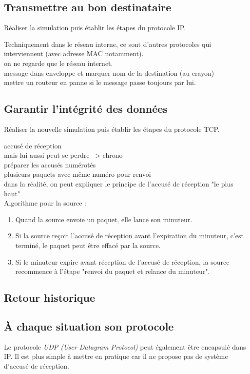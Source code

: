 \documentclass[a4paper,11pt]{article}
\begin{document}
\begin{Form}
\subsection{Transmettre au bon destinataire}
\begin{activite}
Réaliser la simulation puis établir les étapes du protocole IP. 
\end{activite}
\begin{commentprof}
Techniquement dans le réseau interne, ce sont d'autres protocoles qui interviennent (avec adresse MAC notamment).\\ on ne regarde que le réseau internet.\\message dans enveloppe et marquer nom de la destination (au crayon)\\mettre un routeur en panne si le message passe toujours par lui.
\end{commentprof}
\subsection{Garantir l'intégrité des données}
\begin{activite}
Réaliser la nouvelle simulation puis établir les étapes du protocole TCP. 
\end{activite}
\begin{commentprof}
accusé de réception\\mais lui aussi peut se perdre --> chrono\\préparer les accusés numérotés\\plusieurs paquets avec même numéro pour renvoi\\dans la réalité, on peut expliquer le principe de l'accusé de réception "le plus haut"\\
Algorithme pour la source :
\begin{enumerate}
\item Quand la source envoie un paquet, elle lance son minuteur.
\item Si la source reçoit l’accusé de réception avant l’expiration du minuteur, c’est terminé, le paquet peut être effacé par la source.
\item Si le minuteur expire avant réception de l’accusé de réception, la source recommence à l’étape "renvoi du paquet et relance du minuteur".
\end{enumerate}
    
\end{commentprof}
\begin{commentprof}
\section*{Retour historique}
\end{commentprof}
\begin{commentprof}
\section{À chaque situation son protocole}
Le protocole \emph{UDP (User Datagram Protocol)} peut également être encapsulé dans IP. Il est plus simple à mettre en pratique car il ne propose pas de système d'accusé de réception.
\end{commentprof}
\end{Form}
\end{document}
